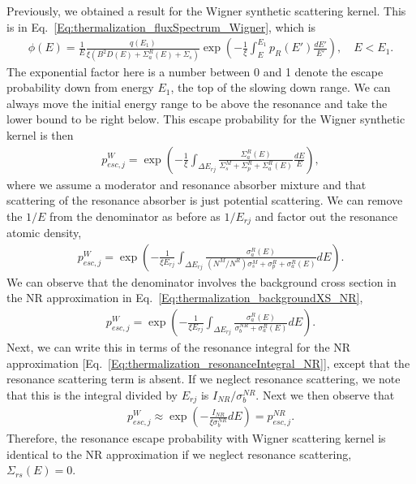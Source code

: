 Previously, we obtained a result for the Wigner synthetic scattering kernel. This is in Eq.~\eqref{Eq:thermalization_fluxSpectrum_Wigner}, which is
\begin{align}
  \phi(E) = \frac{1}{E} \frac{ q(E_1) }{ \xi ( B^2 D(E) + \Sigma_a^R(E) + \Sigma_s )} \exp\left( -\frac{1}{\xi} \int_E^{E_1} p_R(E') \frac{dE'}{E'}  \right) , \quad E < E_1 . \nonumber
\end{align}
The exponential factor here is a number between 0 and 1 denote the escape probability down from energy $E_1$, the top of the slowing down range. We can always move the initial energy range to be above the resonance and take the lower bound to be right below. This escape probability for the Wigner synthetic kernel is then
\begin{align}
  p_{esc,j}^W = \exp\left( -\frac{1}{\xi} \int_{\Delta E_{rj}} \frac{ \Sigma_a^R(E) }{ \Sigma_s^M + \Sigma_p^R + \Sigma_a^R(E) } \frac{dE}{E}  \right) ,
\end{align}
where we assume a moderator and resonance absorber mixture and that scattering of the resonance absorber is just potential scattering. We can remove the $1/E$ from the denominator as before as $1/E_{rj}$ and factor out the resonance atomic density,
\begin{align}
  p_{esc,j}^W = \exp\left( -\frac{1}{\xi E_{rj}} \int_{\Delta E_{rj}} \frac{ \sigma_a^R(E) }{ (N^M/N^R) \sigma_s^M + \sigma_p^R  + \sigma_a^R(E) } dE  \right) .  \nonumber
\end{align}
We can observe that the denominator involves the background cross section in the NR approximation in Eq.~\eqref{Eq:thermalization_backgroundXS_NR},
\begin{align}
  p_{esc,j}^W = \exp\left( -\frac{1}{\xi E_{rj}} \int_{\Delta E_{rj}} \frac{ \sigma_a^R(E) }{ \sigma_b^{NR} + \sigma_a^R(E) } dE  \right) .  \nonumber
\end{align}
Next, we can write this in terms of the resonance integral for the NR approximation [Eq.~\eqref{Eq:thermalization_resonanceIntegral_NR}], except that the resonance scattering term is absent. If we neglect resonance scattering, we note that this is the integral divided by $E_{rj}$ is $I_{NR}/\sigma_b^{NR}$. Next we then observe that
\begin{align}
  p_{esc,j}^W \approx \exp\left( -\frac{I_{NR}}{\xi \sigma_b^{NR}  } dE  \right) = p_{esc,j}^{NR}.
\end{align}
Therefore, the resonance escape probability with Wigner scattering kernel is identical to the NR approximation if we neglect resonance scattering, $\Sigma_{rs}(E) = 0$.

